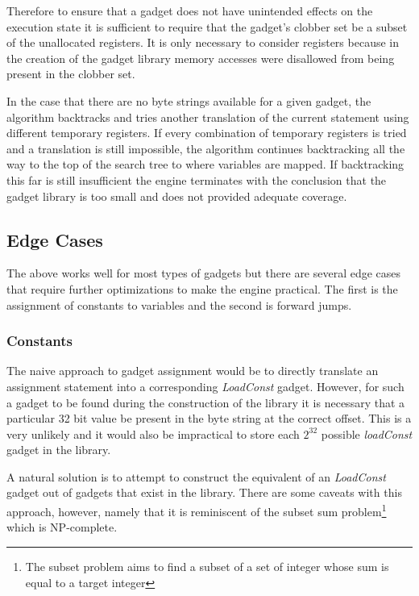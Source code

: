     Therefore to ensure that a gadget does not have unintended effects on the
    execution state it is sufficient to require that the gadget's clobber set be
    a subset of the unallocated registers. It is only necessary to consider
    registers because in the creation of the gadget library memory accesses were
    disallowed from being present in the clobber set.

    In the case that there are no byte strings available for a given gadget, the
    algorithm backtracks and tries another translation of the current statement
    using different temporary registers. If every combination of temporary
    registers is tried and a translation is still impossible, the algorithm
    continues backtracking all the way to the top of the search tree to where
    variables are mapped. If backtracking this far is still insufficient the
    engine terminates with the conclusion that the gadget library is too small
    and does not provided adequate coverage. 

    \subsection{Edge Cases}

    The above works well for most types of gadgets but there are several edge
    cases that require further optimizations to make the engine practical.  The
    first is the assignment of constants to variables and the second is forward
    jumps.

    \subsubsection{Constants}

    The naive approach to gadget assignment would be to directly translate an
    assignment statement into a corresponding \emph{LoadConst} gadget. However,
    for such a gadget to be found during the construction of the library it is
    necessary that a particular 32 bit value be present in the byte string at
    the correct offset. This is a very unlikely and it would also be impractical
    to store each $2^{32}$ possible \emph{loadConst} gadget in the library. 

    A natural solution is to attempt to construct the equivalent of an
    \emph{LoadConst} gadget out of gadgets that exist in the library. There are
    some caveats with this approach, however, namely that it is reminiscent of
    the subset sum problem\footnote{The subset problem aims to find a subset of
    a set of integer whose sum is equal to a target integer} which is
    NP-complete.

